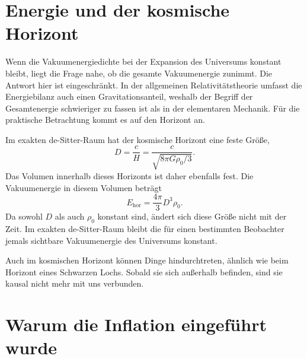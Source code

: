 \section{Energie und der kosmische Horizont}

Wenn die Vakuumenergiedichte bei der Expansion des Universums konstant bleibt, liegt die Frage nahe, ob die gesamte Vakuumenergie zunimmt. Die Antwort hier ist eingeschränkt. In der allgemeinen Relativitätstheorie umfasst die Energiebilanz auch einen Gravitationsanteil, weshalb der Begriff der Gesamtenergie schwieriger zu fassen ist als in der elementaren Mechanik. Für die praktische Betrachtung kommt es auf den Horizont an.

Im exakten de-Sitter-Raum hat der kosmische Horizont eine feste Größe,
\begin{equation}
D=\frac{c}{H}
=\frac{c}{\sqrt{8\pi G\rho_0/3}}.
\end{equation}
Das Volumen innerhalb dieses Horizonts ist daher ebenfalls fest. Die Vakuumenergie in diesem Volumen beträgt
\begin{equation}
E_{\mathrm{hor}}=\frac{4\pi}{3}D^3\rho_0.
\end{equation}
Da sowohl \(D\) als auch \(\rho_0\) konstant sind, ändert sich diese Größe nicht mit der Zeit. Im exakten de-Sitter-Raum bleibt die für einen bestimmten Beobachter jemals sichtbare Vakuumenergie des Universums konstant.

Auch im kosmischen Horizont können Dinge hindurchtreten, ähnlich wie beim Horizont eines Schwarzen Lochs. Sobald sie sich außerhalb befinden, sind sie kausal nicht mehr mit uns verbunden.

\begin{classroomqa}
\end{classroomqa}

\section{Warum die Inflation eingeführt wurde}

